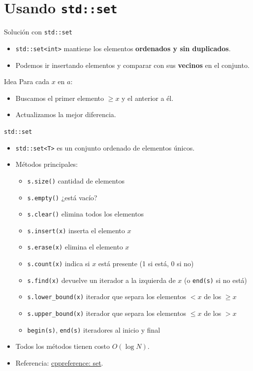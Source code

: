 \documentclass[aspectratio=169]{beamer}
\begin{document}
\section{Usando \texttt{std::set}}

\begin{frame}[fragile]{Solución con \texttt{std::set}}
  \begin{itemize}
    \item \texttt{std::set<int>} mantiene los elementos \textbf{ordenados y sin duplicados}.
    \item Podemos ir insertando elementos y comparar con sus \textbf{vecinos} en el conjunto.
  \end{itemize}
  \begin{block}{Idea}
    Para cada \(x\) en \(a\):
    \begin{itemize}
      \item Buscamos el primer elemento \(\ge x\) y el anterior a él.
      \item Actualizamos la mejor diferencia.
    \end{itemize}
  \end{block}
\end{frame}

\begin{frame}[fragile]{\texttt{std::set}}
  \begin{itemize}
    \item \texttt{std::set<T>} es un conjunto ordenado de elementos únicos.
    \item Métodos principales:
      \begin{itemize}
        \item \texttt{s.size()} cantidad de elementos
        \item \texttt{s.empty()} ¿está vacío?
        \item \texttt{s.clear()} elimina todos los elementos
        \item \texttt{s.insert(x)} inserta el elemento \(x\)
        \item \texttt{s.erase(x)} elimina el elemento \(x\)
        \item \texttt{s.count(x)} indica si \(x\) está presente (1 si está, 0 si no)
        \item \texttt{s.find(x)} devuelve un iterador a la izquierda de \(x\) (o \texttt{end(s)} si no está)
        \item \texttt{s.lower\_bound(x)} iterador que separa los elementos \(< x\) de los \(\ge x\)
        \item \texttt{s.upper\_bound(x)} iterador que separa los elementos \(\le x\) de los \(> x\)
        \item \texttt{begin(s)}, \texttt{end(s)} iteradores al inicio y final
      \end{itemize}
    \item Todos los métodos tienen costo \(O(\log N)\).
    \item Referencia: \href{https://en.cppreference.com/w/cpp/container/set}{cppreference: set}.
  \end{itemize}
\end{frame}
\end{document}

